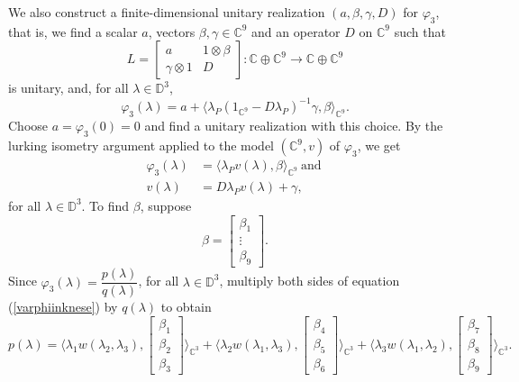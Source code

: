 \documentclass[11pt, reqno]{amsart}
\newcommand\1{\boldsymbol {1}}
\newcommand{\D}{\mathbb{D}}
\newcommand{\ph}{\varphi}
\newcommand\la{\lambda}
\newcommand\beq{\begin{equation}}
\newcommand\eeq{\end{equation}}
\numberwithin{equation}{section}
\begin{document}
 We also construct a finite-dimensional unitary realization $(a,\beta,\gamma,D)$ for $\varphi_3$, that is, we find  a scalar $a$, vectors $\beta,\gamma\in {\mathbb{C}^{9}}$ and an operator $D$ on ${\mathbb{C}^{9}}$ such that
\begin{equation}\label{unitaryopinknese}L = \begin{bmatrix}
    a & 1\otimes\beta\\
    \gamma\otimes 1 & D
\end{bmatrix}:\mathbb{C}\oplus \mathbb{C}^{9} \rightarrow\mathbb{C}\oplus\mathbb{C}^{9}
\end{equation}
is unitary, and, for all $\la\in\D^3$,
\beq\label{formphi-3}
\ph_3(\la) = a+ \langle \lambda_{P}(1_{\mathbb{C}^{9}}-D\lambda_{P})^{-1}\gamma,\beta\rangle_{\mathbb{C}^{9}}.
\eeq
Choose $a=\ph_3(0)=0$ and find a unitary realization with this choice. 
By the lurking isometry argument applied to the model $(\mathbb{C}^{9},v)$ of $\varphi_3$,
we get
\begin{align}
    \varphi_3(\lambda) &= \langle\lambda_{P}v(\lambda),\beta\rangle_{\mathbb{C}^{9}}\ \text {and} \ \label{varphiinknese}\\
    v(\lambda) &= D\lambda_{P}v(\lambda)+\gamma,\label{secondequationinknese}
\end{align}
for all $\la\in\D^3$.
To find $\beta$, suppose 
$$\beta=\begin{bmatrix}
    \beta_{1}\\
    \vdots\\
    \beta_{9}
\end{bmatrix}.$$
Since $\varphi_3(\lambda)=\dfrac{p(\lambda)}{q(\lambda)}$, for all $\la\in\D^3$, multiply both sides of equation (\ref{varphiinknese}) by $q(\lambda)$ to obtain 
$$p(\lambda) = \Bigg\langle\lambda_{1} w(\lambda_{2},\lambda_{3}),\begin{bmatrix}
    \beta_{1}\\
    \beta_{2}\\
    \beta_{3}
\end{bmatrix}\Bigg\rangle_{\mathbb{C}^{3}}+\Bigg\langle\lambda_{2} w(\lambda_{1},\lambda_{3}),\begin{bmatrix}
    \beta_{4}\\
    \beta_{5}\\
    \beta_{6}
\end{bmatrix}\Bigg\rangle_{\mathbb{C}^{3}}+\Bigg\langle\lambda_{3} w(\lambda_{1},\lambda_{2}),\begin{bmatrix}
    \beta_{7}\\
    \beta_{8}\\
    \beta_{9}
\end{bmatrix}\Bigg\rangle_{\mathbb{C}^{3}}.$$
\end{document}
